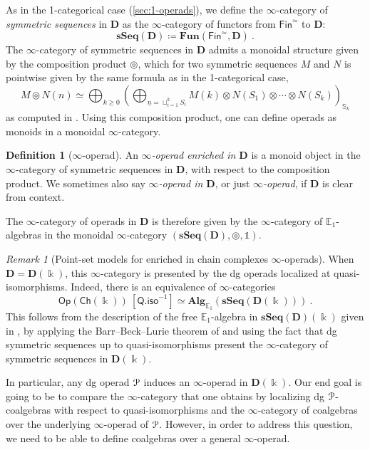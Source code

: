 \documentclass[a4paper,12pt]{amsart}
\renewcommand{\mathcal}{\EuScript}
\theoremstyle{plain}
\theoremstyle{definition}
\newtheorem{definition}[theorem]{Definition}%
\theoremstyle{remark}
\newtheorem{remark}[theorem]{\sc Remark}%
\newcommand{\kk}{\Bbbk}
\begin{document}

As in the 1-categorical case (\cref{sec:1-operads}), we define the $\infty$-category of \textit{symmetric sequences} in $\mathbf{D}$ as the $\infty$-category of functors from $\mathsf{Fin}^{\simeq}$ to $\mathbf{D}$:
\[
\mathbf{sSeq}(\mathbf{D}) \coloneqq \mathbf{Fun}(\mathsf{Fin}^{\simeq},\mathbf{D})~. 
\]The $\infty$-category of symmetric sequences in $\mathbf{D}$ admits a monoidal structure given by the composition product $\circledcirc$, which for two symmetric sequences $M$ and $N$ is pointwise given by the same formula as in the 1-categorical case, 
\[
M \circledcirc N(n) \simeq \bigoplus_{k \geq 0} \left(\bigoplus_{\underline{n} = \sqcup_{i=1}^k S_i} M(k) \otimes N(S_1) \otimes \cdots \otimes N(S_k)\right)_{\mathbb{S}_k} 
\]
as computed in \cite[Appendix A.1.]{ShiPhD}. Using this composition product, one can define operads as monoids in a monoidal $\infty$-category.

\begin{definition}[$\infty$-operad]
An \emph{$\infty$-operad enriched in $\mathbf D$}  is  a monoid object in the $\infty$-category of symmetric sequences in $\mathbf D$, with respect to the composition product. We sometimes also say \emph{$\infty$-operad in $\mathbf D$}, or just \emph{$\infty$-operad}, if $\mathbf D$ is clear from context. 
\end{definition}



The $\infty$-category of operads in $\mathbf{D}$ is therefore given by the $\infty$-category of $\mathbb{E}_1$-algebras in  the monoidal $\infty$-category $(\mathbf{sSeq}(\mathbf{D}),\circledcirc, \mathbb{1})$. 


\begin{remark}[Point-set models for enriched in chain complexes $\infty$-operads]
When $\mathbf D = \mathbf D(\kk)$, this $\infty$-category is presented by the dg operads localized at quasi-isomorphisms. Indeed, there is an equivalence of $\infty$-categories
\[
\mathsf{Op}(\mathsf{Ch}(\kk))~[\mathsf{Q.iso}^{-1}] \simeq \mathbf{Alg}_{\mathbb{E}_1}(\mathbf{sSeq}(\mathbf{D}(\kk)))~. 
\]
This follows from the description of the free $\mathbb{E}_1$-algebra in $\mathbf{sSeq}(\mathbf{D})(\kk)$ given in \cite[Theorem B.2]{pdalgebras}, by applying the Barr--Beck--Lurie theorem of \cite[Theorem 4.7.3.5]{HigherAlgebra} and using the fact that dg symmetric sequences up to quasi-isomorphisms present the $\infty$-category of symmetric sequences in $\mathbf{D}(\kk)$. 


In particular, any dg operad $\mathcal{P}$ induces an $\infty$-operad in $\mathbf{D}(\kk)$. Our end goal is going to be to compare the $\infty$-category that one obtains by localizing dg $\mathcal{P}$-coalgebras with respect to quasi-isomorphisms and the $\infty$-category of coalgebras over the underlying $\infty$-operad of $\mathcal{P}$. However, in order to address this question, we need to be able to define coalgebras over a general $\infty$-operad. 
\end{remark}
\end{document}
